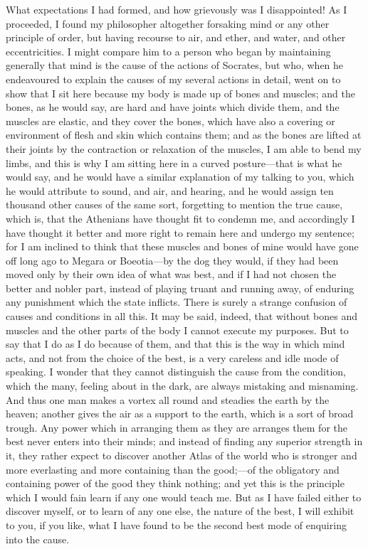 \documentclass[11pt,letter]{article}
\begin{document}
\par  What expectations I had formed, and how grievously was I disappointed! As I proceeded, I found my philosopher altogether forsaking mind or any other principle of order, but having recourse to air, and ether, and water, and other eccentricities. I might compare him to a person who began by maintaining generally that mind is the cause of the actions of Socrates, but who, when he endeavoured to explain the causes of my several actions in detail, went on to show that I sit here because my body is made up of bones and muscles; and the bones, as he would say, are hard and have joints which divide them, and the muscles are elastic, and they cover the bones, which have also a covering or environment of flesh and skin which contains them; and as the bones are lifted at their joints by the contraction or relaxation of the muscles, I am able to bend my limbs, and this is why I am sitting here in a curved posture—that is what he would say, and he would have a similar explanation of my talking to you, which he would attribute to sound, and air, and hearing, and he would assign ten thousand other causes of the same sort, forgetting to mention the true cause, which is, that the Athenians have thought fit to condemn me, and accordingly I have thought it better and more right to remain here and undergo my sentence; for I am inclined to think that these muscles and bones of mine would have gone off long ago to Megara or Boeotia—by the dog they would, if they had been moved only by their own idea of what was best, and if I had not chosen the better and nobler part, instead of playing truant and running away, of enduring any punishment which the state inflicts. There is surely a strange confusion of causes and conditions in all this. It may be said, indeed, that without bones and muscles and the other parts of the body I cannot execute my purposes. But to say that I do as I do because of them, and that this is the way in which mind acts, and not from the choice of the best, is a very careless and idle mode of speaking. I wonder that they cannot distinguish the cause from the condition, which the many, feeling about in the dark, are always mistaking and misnaming. And thus one man makes a vortex all round and steadies the earth by the heaven; another gives the air as a support to the earth, which is a sort of broad trough. Any power which in arranging them as they are arranges them for the best never enters into their minds; and instead of finding any superior strength in it, they rather expect to discover another Atlas of the world who is stronger and more everlasting and more containing than the good;—of the obligatory and containing power of the good they think nothing; and yet this is the principle which I would fain learn if any one would teach me. But as I have failed either to discover myself, or to learn of any one else, the nature of the best, I will exhibit to you, if you like, what I have found to be the second best mode of enquiring into the cause.
\end{document}
